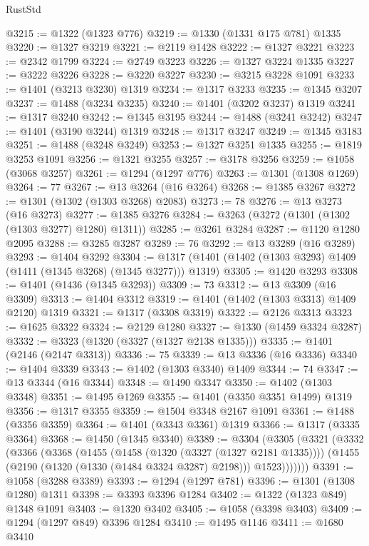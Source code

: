 \begin{lexlean}{RustStd}
\begin{coremodule}
@3215 := @1322 (@1323 @776)
@3219 := @1330 (@1331 @175 @781) @1335
@3220 := @1327 @3219
@3221 := @2119 @1428
@3222 := @1327 @3221
@3223 := @2342 @1799
@3224 := @2749 @3223
@3226 := @1327 @3224 @1335
@3227 := @3222 @3226
@3228 := @3220 @3227
@3230 := @3215 @3228 @1091
@3233 := @1401 (@3213 @3230) @1319
@3234 := @1317 @3233
@3235 := @1345 @3207
@3237 := @1488 (@3234 @3235)
@3240 := @1401 (@3202 @3237) @1319
@3241 := @1317 @3240
@3242 := @1345 @3195
@3244 := @1488 (@3241 @3242)
@3247 := @1401 (@3190 @3244) @1319
@3248 := @1317 @3247
@3249 := @1345 @3183
@3251 := @1488 (@3248 @3249)
@3253 := @1327 @3251 @1335
@3255 := @1819 @3253 @1091
@3256 := @1321 @3255
@3257 := @3178 @3256
@3259 := @1058 (@3068 @3257)
@3261 := @1294 (@1297 @776)
@3263 := @1301 (@1308 @1269)
@3264 := 77
@3267 := @13 @3264 (@16 @3264)
@3268 := @1385 @3267
@3272 := @1301 (@1302 (@1303 @3268) @2083)
@3273 := 78
@3276 := @13 @3273 (@16 @3273)
@3277 := @1385 @3276
@3284 := @3263 (@3272 (@1301 (@1302 (@1303 @3277) @1280) @1311))
@3285 := @3261 @3284
@3287 := @1120 @1280 @2095
@3288 := @3285 @3287
@3289 := 76
@3292 := @13 @3289 (@16 @3289)
@3293 := @1404 @3292
@3304 := @1317 (@1401 (@1402 (@1303 @3293) @1409 (@1411 (@1345 @3268) (@1345 @3277))) @1319)
@3305 := @1420 @3293
@3308 := @1401 (@1436 (@1345 @3293))
@3309 := 73
@3312 := @13 @3309 (@16 @3309)
@3313 := @1404 @3312
@3319 := @1401 (@1402 (@1303 @3313) @1409 @2120) @1319
@3321 := @1317 (@3308 @3319)
@3322 := @2126 @3313
@3323 := @1625 @3322
@3324 := @2129 @1280
@3327 := @1330 (@1459 @3324 @3287)
@3332 := @3323 (@1320 (@3327 (@1327 @2138 @1335)))
@3335 := @1401 (@2146 (@2147 @3313))
@3336 := 75
@3339 := @13 @3336 (@16 @3336)
@3340 := @1404 @3339
@3343 := @1402 (@1303 @3340) @1409
@3344 := 74
@3347 := @13 @3344 (@16 @3344)
@3348 := @1490 @3347
@3350 := @1402 (@1303 @3348)
@3351 := @1495 @1269
@3355 := @1401 (@3350 @3351 @1499) @1319
@3356 := @1317 @3355
@3359 := @1504 @3348 @2167 @1091
@3361 := @1488 (@3356 @3359)
@3364 := @1401 (@3343 @3361) @1319
@3366 := @1317 (@3335 @3364)
@3368 := @1450 (@1345 @3340)
@3389 := @3304
    (@3305
      (@3321
        (@3332
          (@3366
            (@3368
              (@1455
                (@1458 (@1320 (@3327 (@1327 @2181 @1335))))
                (@1455 (@2190 (@1320 (@1330 (@1484 @3324 @3287) @2198))) @1523)))))))
@3391 := @1058 (@3288 @3389)
@3393 := @1294 (@1297 @781)
@3396 := @1301 (@1308 @1280) @1311
@3398 := @3393 @3396 @1284
@3402 := @1322 (@1323 @849) @1348 @1091
@3403 := @1320 @3402
@3405 := @1058 (@3398 @3403)
@3409 := @1294 (@1297 @849) @3396 @1284
@3410 := @1495 @1146
@3411 := @1680 @3410

\end{coremodule}
\end{lexlean}

